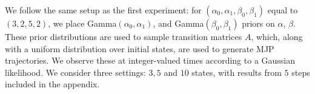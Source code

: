 


We follow the same setup as the first experiment:
for $(\alpha_0,\alpha_1,\beta_0,\beta_1)$ equal to $(3,2,5,2)$,
we place Gamma$(\alpha_0,\alpha_1)$, and Gamma$(\beta_0, \beta_1)$ priors on $\alpha$, $\beta$. 
These prior distributions are used to sample transition matrices $A$, which, along with a uniform distribution over initial states, are used to generate MJP trajectories. 
We observe these at integer-valued times according to a Gaussian likelihood.
We consider three settings: $3, 5$ and $10$ states, with results from $5$ steps included in the appendix. 

